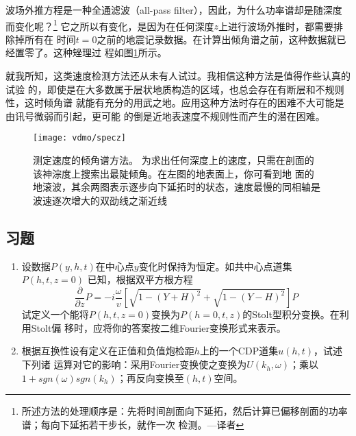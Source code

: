 波场外推方程是一种全通滤波（all-pass filter），因此，为什么功率谱却是随深度而变化呢？\footnote{
所述方法的处理顺序是：先将时间剖面向下延拓，然后计算已偏移剖面的功率谱；每向下延拓若干步长，就作一次
检测。---译者}
它之所以有变化，是因为在任何深度$z$上进行波场外推时，都需要排除掉所有在
时间$t=0$之前的地震记录数据。在计算出倾角谱之前，这种数据就已经置零了。这种矬理过
程如图\ref{fig:vdmo/specz}所示。

就我所知，这类速度检测方法还从未有人试过。我相信这种方法是值得作些认真的试验
的，即使是在大多数属于层状地质构造的区域，也总会存在有断层和不规则性，这时倾角谱
就能有充分的用武之地。应用这种方法时存在的困难不大可能是由讯号微弱而引起，更可能
的倒是近地表速度不规则性而产生的潜在困难。

\begin{figure}[H]
\centering
\texttt{[image: vdmo/specz]}
\caption[specz]{测定速度的倾角谱方法。
为求出任何深度上的速度，只需在剖面的该神淙度上搜索出最陡倾角。在左图的地表面上，你可看到地
面的地滚波，其余两图表示逐步向下延拓时的状态，速度最慢的同相轴是波速逐次增大的双劭线之渐近线}
\label{fig:vdmo/specz}
\end{figure}

\subsection{习题}
\label{sec:3.5.11}

\begin{enumerate}
\item 设数据$P(y, h, t)$在中心点$y$变化时保持为恒定。如共中心点道集$P(h,t,z = 0)$
已知，根据双平方根方程
\begin{equation*}
\frac{\partial }{\partial z}P=-i\frac{\omega}{v}[\sqrt{1-(Y+H)^2}+\sqrt{1-(Y-H)^2}]P
\end{equation*}
试定义一个能将$P(h,t,z = 0)$变换为$P(h=0, t, z)$的Stolt型积分变换。在利用Stolt偏
移时，应将你的答案按二维Fourier变换形式来表示。

\item 根据互换性设有定义在正值和负值炮检距$h$上的一个CDP道集$u(h,t)$，试述下列诸
运算对它的影响：采用Fourier变换使之变换为$U(k_h, \omega)$；乘以$1 + sgn (\omega)
sgn(k_h)$；再反向变换至$(h,t)$空间。

\end{enumerate}

